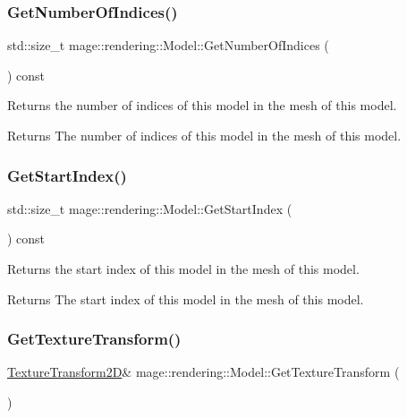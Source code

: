\subsubsection{\texorpdfstring{Get\+Number\+Of\+Indices()}{GetNumberOfIndices()}}
{\footnotesize\ttfamily std\+::size\+\_\+t mage\+::rendering\+::\+Model\+::\+Get\+Number\+Of\+Indices (\begin{DoxyParamCaption}{ }\end{DoxyParamCaption}) const\hspace{0.3cm}{\ttfamily [noexcept]}}

Returns the number of indices of this model in the mesh of this model.

\begin{DoxyReturn}{Returns}
The number of indices of this model in the mesh of this model. 
\end{DoxyReturn}
\mbox{\label{classmage_1_1rendering_1_1_model_a419dd6f4ea7f32ac3d165ce87d54fb47}} 
\subsubsection{\texorpdfstring{Get\+Start\+Index()}{GetStartIndex()}}
{\footnotesize\ttfamily std\+::size\+\_\+t mage\+::rendering\+::\+Model\+::\+Get\+Start\+Index (\begin{DoxyParamCaption}{ }\end{DoxyParamCaption}) const\hspace{0.3cm}{\ttfamily [noexcept]}}

Returns the start index of this model in the mesh of this model.

\begin{DoxyReturn}{Returns}
The start index of this model in the mesh of this model. 
\end{DoxyReturn}
\mbox{\label{classmage_1_1rendering_1_1_model_a3b016097dfa0d9da3430acaa680fbb36}} 
\subsubsection{\texorpdfstring{Get\+Texture\+Transform()}{GetTextureTransform()}\hspace{0.1cm}{\footnotesize\ttfamily [1/2]}}
{\footnotesize\ttfamily \mbox{\hyperlink{classmage_1_1_texture_transform2_d}{Texture\+Transform2D}}\& mage\+::rendering\+::\+Model\+::\+Get\+Texture\+Transform (\begin{DoxyParamCaption}{ }\end{DoxyParamCaption})\hspace{0.3cm}{\ttfamily [noexcept]}}


